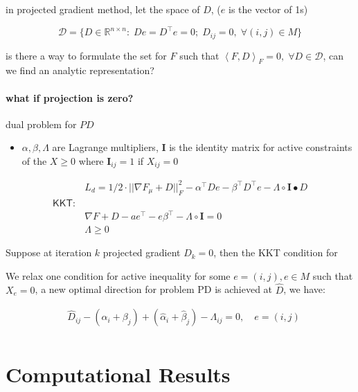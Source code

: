 \documentclass[
  10pt,
  a4paper,
,tablecaptionabove
]{scrartcl}
\providecommand{\tightlist}{%
  \setlength{\itemsep}{0pt}\setlength{\parskip}{0pt}}
\begin{document}
in projected gradient method, let the space of \(D\), (\(e\) is the
vector of 1s)

\[\mathcal D = \{D\in\mathbb{R}^{n\times n} : \; D e = D^\top e = 0;\; D_{ij} = 0,\;\forall  (i,j) \in M \}\]

is there a way to formulate the set for \(F\) such that
\(\left <F, D \right>_F = 0, \; \forall D\in \mathcal D\), can we find
an analytic representation?

\hypertarget{what-if-projection-is-zero}{%
\paragraph{what if projection is
zero?}\label{what-if-projection-is-zero}}

dual problem for \(PD\)

\begin{itemize}
\tightlist
\item
  \(\alpha,\beta,\Lambda\) are Lagrange multipliers, \(\mathbf I\) is
  the identity matrix for active constraints of the \(X \ge 0\) where
  \(\mathbf I_{ij} = 1\) if \(X_{ij} = 0\)
\end{itemize}

\[\begin{aligned}
& L_d = 1/2\cdot ||\nabla F_\mu + D ||_F^2 - \alpha^\top De - \beta^\top D^\top e -\Lambda \circ \mathbf I \bullet D\\
\mathsf{KKT:} & \\
& \nabla F+D - ae^\top - e\beta^\top -\Lambda \circ \mathbf{I} = 0 \\
& \Lambda \ge 0
\end{aligned}\]

Suppose at iteration \(k\) projected gradient \(D_k = 0\), then the KKT
condition for

We relax one condition for active inequality for some
\(e = (i,j), e \in M\) such that \(X_e =0\), a new optimal direction for
problem PD is achieved at \(\hat D\), we have:

\[\begin{aligned}
 & \hat D_{ij} - (\alpha_i + \beta_j) + (\hat \alpha_i + \hat \beta_j) - \Lambda_{ij} = 0, \quad e = (i,j) \\
\end{aligned}\]

\hypertarget{computational-results}{%
\section{Computational Results}\label{computational-results}}
\end{document}
